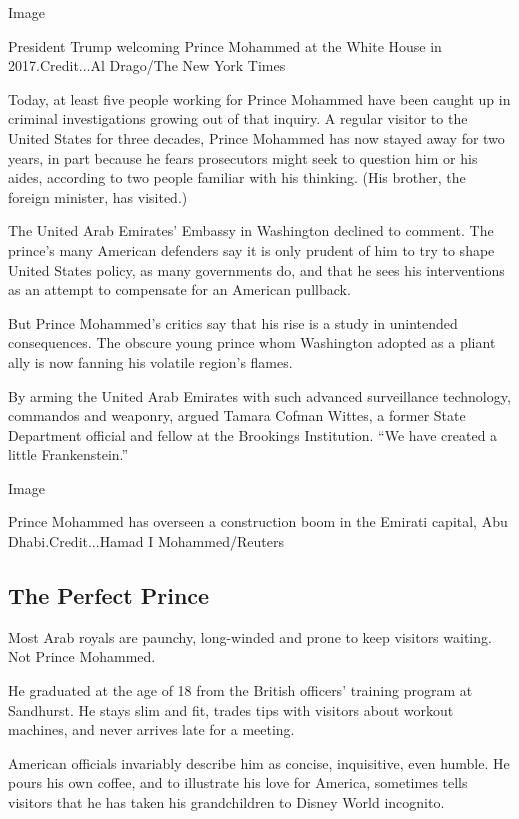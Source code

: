 Image

President Trump welcoming Prince Mohammed at the White House in
2017.Credit...Al Drago/The New York Times

Today, at least five people working for Prince Mohammed have been caught
up in criminal investigations growing out of that inquiry. A regular
visitor to the United States for three decades, Prince Mohammed has now
stayed away for two years, in part because he fears prosecutors might
seek to question him or his aides, according to two people familiar with
his thinking. (His brother, the foreign minister, has visited.)

The United Arab Emirates' Embassy in Washington declined to comment. The
prince's many American defenders say it is only prudent of him to try to
shape United States policy, as many governments do, and that he sees his
interventions as an attempt to compensate for an American pullback.

But Prince Mohammed's critics say that his rise is a study in unintended
consequences. The obscure young prince whom Washington adopted as a
pliant ally is now fanning his volatile region's flames.

By arming the United Arab Emirates with such advanced surveillance
technology, commandos and weaponry, argued Tamara Cofman Wittes, a
former State Department official and fellow at the Brookings
Institution. ``We have created a little Frankenstein.''

Image

Prince Mohammed has overseen a construction boom in the Emirati capital,
Abu Dhabi.Credit...Hamad I Mohammed/Reuters

\hypertarget{the-perfect-prince}{%
\subsection{The Perfect Prince}\label{the-perfect-prince}}

Most Arab royals are paunchy, long-winded and prone to keep visitors
waiting. Not Prince Mohammed.

He graduated at the age of 18 from the British officers' training
program at Sandhurst. He stays slim and fit, trades tips with visitors
about workout machines, and never arrives late for a meeting.

American officials invariably describe him as concise, inquisitive, even
humble. He pours his own coffee, and to illustrate his love for America,
sometimes tells visitors that he has taken his grandchildren to Disney
World incognito.

